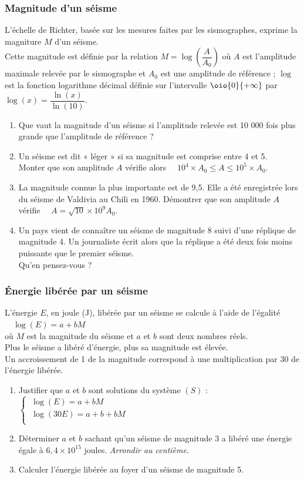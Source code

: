 \documentclass[a4paper,11pt,exos]{nsi} %
\begin{document}
\subsubsection*{Magnitude d'un séisme}
L'échelle de Richter, basée sur les mesures faites par les sismographes, exprime la magniture $M$ d'un séisme.\\
Cette magnitude est définie par la relation $M=\log\left(\dfrac{A}{A_0}\right)$ où $A$ est l'amplitude maximale relevée par le sismographe et $A_0$ est une amplitude de référence ; $\log$ est la fonction logarithme décimal définie sur l'intervalle $\oio{0}{+\infty}$ par $\log(x)=\dfrac{\ln(x)}{\ln(10)}$.
\begin{enumerate}
    \item Que vaut la magnitude d'un séisme si l'amplitude relevée est 10 000 fois plus grande que l'amplitude de référence ?
    \item Un séisme est dit « léger » si sa magnitude est comprise entre 4 et 5.\\
    Monter que son amplitude $A$ vérifie alors $\quad 10^4 \times A_0\leqslant 
    A\leqslant 10^5\times A_0$.
    \item La magnitude connue la plus importante est de 9,5. Elle a été enregistrée lors du séisme de Valdivia au Chili en 1960. Démontrer que son amplitude $A$ vérifie $\quad A=\sqrt{10}\times 10^9 A_0$.
    \item Un pays vient de connaître un séisme de magnitude 8 suivi d'une réplique de magnitude 4. Un journaliste écrit alors que la réplique a été deux fois moins puissante que le premier séisme.\\
    Qu'en pensez-vous ?
\end{enumerate}

\subsubsection*{Énergie libérée par un séisme}
L'énergie $E$, en joule (J), libérée par un séisme se calcule à l'aide de l'égalité $\quad \log(E)=a+bM$\\
où $M$ est la magnitude du séisme et $a$ et $b$ sont deux nombres réels.\\
Plus le séisme a libéré d'énergie, plus sa magnitude est élevée.\\
Un accroissement de 1 de la magnitude correspond à une multiplication par 30 de l'énergie libérée.
\begin{enumerate}
    \item Justifier que $a$ et $b$ sont solutions du système $(S)$ :
     $\left\{
			\begin{array}{l}
				\ \log(E)=a+bM \\
				\ \log(30E)=a+b+bM \\
			\end{array} \right.$
    \item Déterminer $a$ et $b$ sachant qu'un séisme de magnitude 3 a libéré une énergie égale à $6,4\times 10^{15}$ joules. \textit{Arrondir au centième}.
    \item Calculer l'énergie libérée au foyer d'un séisme de magnitude 5.
\end{enumerate}

\newpage
\end{document}
